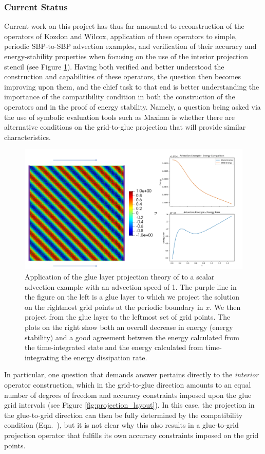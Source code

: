 \subsubsection{Current Status}

Current work on this project has thus far amounted to reconstruction of the
operators of Kozdon and Wilcox, application of these operators to simple, periodic
SBP-to-SBP advection examples, and verification of their accuracy and energy-stability
properties when focusing on the use of the interior projection stencil (see Figure \ref{fig:advection_projection}).
Having both verified and better understood the construction and capabilities of these operators,
the question then becomes improving upon them, and the chief task to that end is
better understanding the importance of the compatibility condition in both the
construction of the operators and in the proof of energy stability. Namely,
a question being asked via the use of symbolic evaluation tools such as Maxima \cite{li2008maxima}
is whether there are alternative conditions on the grid-to-glue projection that
will provide similar characteristics.
\begin{figure}
\centering
\includegraphics[width=0.9\linewidth,trim=4 4 4 4,clip]{figures/advection_projection.png}
\caption{Application of the glue layer projection theory of \cite{kozdon2016stable} to a
	 scalar advection example with an advection speed of 1. The purple line in the figure
	 on the left is a glue layer to which we project the solution on the rightmost grid points
	 at the periodic boundary in $x$. We then project from the glue layer to the leftmost set
	 of grid points. The plots on the right show both an overall decrease in energy (energy stability)
	 and a good agreement between the energy calculated from the time-integrated state and the energy
	 calculated from time-integrating the energy dissipation rate.}
\label{fig:advection_projection}
\end{figure}
In particular, one question that demands answer pertains directly to the
\emph{interior} operator construction, which in the grid-to-glue direction
amounts to an equal number of degrees of freedom and accuracy constraints
imposed upon the glue grid intervals (see Figure \ref{fig:projection_layout}). In
this case, the projection in the glue-to-grid direction can then be fully
determined by the compatibility condition (Eqn.~), but
it is not clear why this also results in a glue-to-grid projection operator
that fulfills its own accuracy constraints imposed on the grid points.

